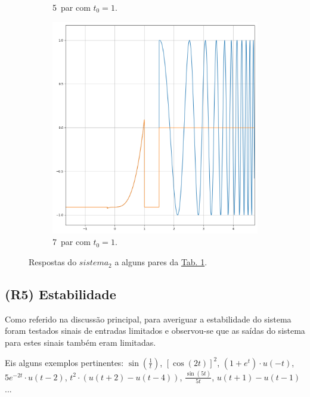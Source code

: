 \begin{figure}[H]
\begin{subfigure}[b]{0.5\linewidth}
        \caption{5\textordmasculine\ par com \(t_0 = 1\).} 
        \label{fig:par_5} 
    \end{subfigure}%
    \begin{subfigure}[b]{0.5\linewidth}
        \centering
        \includegraphics[width=0.6\linewidth]{prints/par_7.png} 
        \caption{7\textordmasculine\ par com \(t_0 = 1\).} 
        \label{fig:par_7} 
    \end{subfigure}
    \caption{Respostas do \(sistema_2\) a alguns pares da \hyperref[tab:table1]{Tab. 1}.}
    \label{fig:appendix_A.1}
\end{figure}

\clearpage
\subsection{(R5) Estabilidade} %

Como referido na discussão principal, para averiguar a estabilidade do sistema foram testados sinais de entradas limitados e observou-se que as saídas do sistema para estes sinais também eram limitadas.

Eis alguns exemplos pertinentes: \( \sin(\frac{1}{t}) \), \( [\cos(2t)]^2 \), \( (1+e^t) \cdot u(-t) \), \( 5e^{-2t} \cdot u(t-2) \), \( t^2 \cdot (u(t+2) - u(t-4)) \), \( \frac{\sin(5t)}{5t} \), \(u(t+1)-u(t-1)\)...

